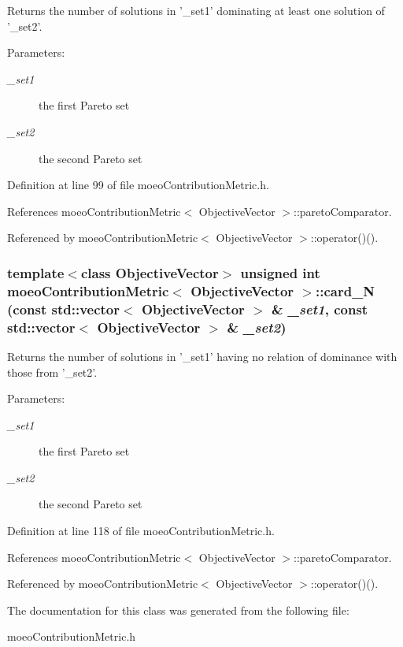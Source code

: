 Returns the number of solutions in '\_\-set1' dominating at least one solution of '\_\-set2'. 

\begin{Desc}
\item[Parameters:]
\begin{description}
\item[{\em \_\-set1}]the first Pareto set \item[{\em \_\-set2}]the second Pareto set \end{description}
\end{Desc}


Definition at line 99 of file moeo\-Contribution\-Metric.h.

References moeo\-Contribution\-Metric$<$ Objective\-Vector $>$::pareto\-Comparator.

Referenced by moeo\-Contribution\-Metric$<$ Objective\-Vector $>$::operator()().
\subsubsection{\setlength{\rightskip}{0pt plus 5cm}template$<$class Objective\-Vector$>$ unsigned int \bf{moeo\-Contribution\-Metric}$<$ \bf{Objective\-Vector} $>$::card\_\-N (const std::vector$<$ \bf{Objective\-Vector} $>$ \& {\em \_\-set1}, const std::vector$<$ \bf{Objective\-Vector} $>$ \& {\em \_\-set2})\hspace{0.3cm}{\tt  [inline, private]}}\label{classmoeoContributionMetric_df26b17120ed2271a6d1ec9c8c77b451}


Returns the number of solutions in '\_\-set1' having no relation of dominance with those from '\_\-set2'. 

\begin{Desc}
\item[Parameters:]
\begin{description}
\item[{\em \_\-set1}]the first Pareto set \item[{\em \_\-set2}]the second Pareto set \end{description}
\end{Desc}


Definition at line 118 of file moeo\-Contribution\-Metric.h.

References moeo\-Contribution\-Metric$<$ Objective\-Vector $>$::pareto\-Comparator.

Referenced by moeo\-Contribution\-Metric$<$ Objective\-Vector $>$::operator()().

The documentation for this class was generated from the following file:\begin{CompactItemize}
\item 
moeo\-Contribution\-Metric.h\end{CompactItemize}
